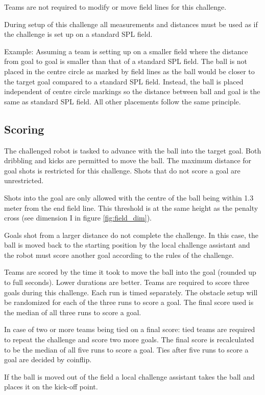 Teams are not required to modify or move field lines for this challenge.

During setup of this challenge all measurements and distances must be used as if the challenge is set up on a standard SPL field.

Example: Assuming a team is setting up on a smaller field where the distance from goal to goal is smaller than that of a standard SPL field. The ball is not placed in the centre circle as marked by field lines as the ball would be closer to the target goal compared to a standard SPL field. Instead, the ball is placed independent of centre circle markings so the distance between ball and goal is the same as standard SPL field. All other placements follow the same principle.


\subsection{Scoring}

The challenged robot is tasked to advance with the ball into the target goal. Both dribbling and kicks are permitted to move the ball. The maximum distance for goal shots is restricted for this challenge. Shots that do not score a goal are unrestricted.

Shots into the goal are only allowed with the centre of the ball being within 1.3 meter from the end field line. This threshold is at the same height as the penalty cross (see dimension I in figure \ref{fig:field_dim}).

Goals shot from a larger distance do not complete the challenge. In this case, the ball is moved back to the starting position by the local challenge assistant and the robot must score another goal according to the rules of the challenge.

Teams are scored by the time it took to move the ball into the goal (rounded up to full seconds). Lower durations are better. Teams are required to score three goals during this challenge. Each run is timed separately. The obstacle setup will be randomized for each of the three runs to score a goal. The final score used is the median of all three runs to score a goal.

In case of two or more teams being tied on a final score: tied teams are required to repeat the challenge and score two more goals. The final score is recalculated to be the median of all five runs to score a goal. Ties after five runs to score a goal are decided by coinflip.

If the ball is moved out of the field a local challenge assistant takes the ball and places it on the kick-off point.

